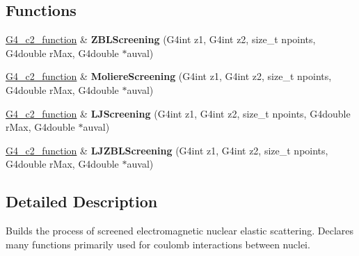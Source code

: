 \subsection*{Functions}
\begin{DoxyCompactItemize}
\item 
\hypertarget{G4ScreenedNuclearRecoil_8hh_a38390a6f2bb8ba250affdccb1c9cc49c}{\hyperlink{classc2__function}{G4\-\_\-c2\-\_\-function} \& {\bfseries Z\-B\-L\-Screening} (G4int z1, G4int z2, size\-\_\-t npoints, G4double r\-Max, G4double $\ast$auval)}\label{G4ScreenedNuclearRecoil_8hh_a38390a6f2bb8ba250affdccb1c9cc49c}

\item 
\hypertarget{G4ScreenedNuclearRecoil_8hh_af83b8ddfa7c0df319b4573c74bb4afd3}{\hyperlink{classc2__function}{G4\-\_\-c2\-\_\-function} \& {\bfseries Moliere\-Screening} (G4int z1, G4int z2, size\-\_\-t npoints, G4double r\-Max, G4double $\ast$auval)}\label{G4ScreenedNuclearRecoil_8hh_af83b8ddfa7c0df319b4573c74bb4afd3}

\item 
\hypertarget{G4ScreenedNuclearRecoil_8hh_afab442d2da9f659d2c7d4b9bb1e64f5e}{\hyperlink{classc2__function}{G4\-\_\-c2\-\_\-function} \& {\bfseries L\-J\-Screening} (G4int z1, G4int z2, size\-\_\-t npoints, G4double r\-Max, G4double $\ast$auval)}\label{G4ScreenedNuclearRecoil_8hh_afab442d2da9f659d2c7d4b9bb1e64f5e}

\item 
\hypertarget{G4ScreenedNuclearRecoil_8hh_a1e2dbe4b8a87ad052a14e6c21ad98cbf}{\hyperlink{classc2__function}{G4\-\_\-c2\-\_\-function} \& {\bfseries L\-J\-Z\-B\-L\-Screening} (G4int z1, G4int z2, size\-\_\-t npoints, G4double r\-Max, G4double $\ast$auval)}\label{G4ScreenedNuclearRecoil_8hh_a1e2dbe4b8a87ad052a14e6c21ad98cbf}

\end{DoxyCompactItemize}


\subsection{Detailed Description}
Builds the process of screened electromagnetic nuclear elastic scattering. Declares many functions primarily used for coulomb interactions between nuclei. 